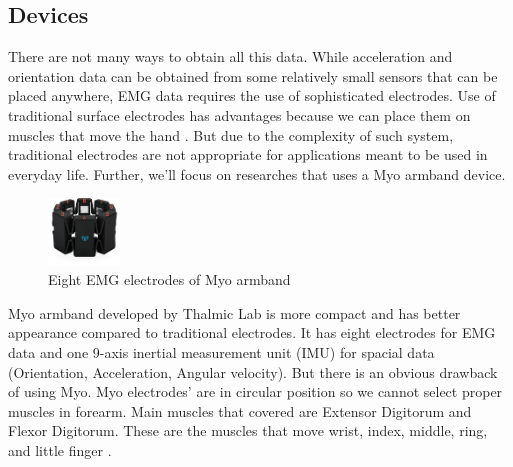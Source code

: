 \documentclass[conference,compsoc]{IEEEtran}
\begin{document}
\subsection{Devices}
There are not many ways to obtain all this data.  While acceleration and orientation data can be obtained from some relatively small sensors that can be placed anywhere, EMG data requires the use of sophisticated electrodes. Use of traditional surface electrodes has advantages because we can place them on muscles that move the hand \cite{time_series_comparison}. But due to the complexity of such system, traditional electrodes are not appropriate for applications meant to be used in everyday life. Further, we'll focus on researches that uses a Myo armband device. 
\begin{figure}
    \centering
    \caption{Eight EMG electrodes of Myo armband}
    \includegraphics[width=0.17\textwidth]{1zyez3r}
\end{figure} 
Myo armband developed by Thalmic Lab is more compact and has better appearance compared to traditional electrodes. It has eight electrodes for EMG data and one 9-axis inertial measurement unit (IMU) for spacial data (Orientation, Acceleration, Angular velocity).
But there is an obvious drawback of using Myo. Myo electrodes' are in circular position so we cannot select proper muscles in forearm. Main muscles that covered are Extensor Digitorum and Flexor Digitorum. These are the muscles that move wrist, index, middle, ring, and little finger \cite{time_series_comparison}.
\end{document}
